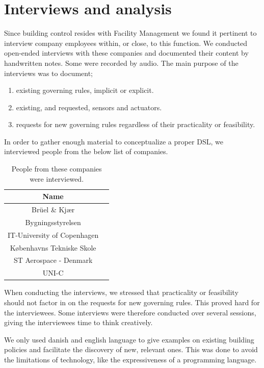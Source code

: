 \documentclass{llncs}
\begin{document}
\section{Interviews and analysis}\label{sec:interviews}
Since building control resides with Facility Management we found it pertinent to interview company employees within, or close, to this function. We conducted open-ended interviews with these companies and documented their content by handwritten notes. Some were recorded by audio. The main purpose of the interviews was to document;

\begin{enumerate}
	\item existing governing rules, implicit or explicit.
	\item existing, and requested, sensors and actuators.
	\item requests for new governing rules regardless of their practicality or feasibility.
\end{enumerate}

In order to gather enough material to conceptualize a proper DSL, we interviewed people from the below list of companies.\\ 

\begin{table}[htdp]
\begin{center}
\begin{tabular}{|c|c|}
	\textbf{Name}\\
	\hline 
	Br\"{u}el \& Kj\ae r\\
	Bygningsstyrelsen\\
	IT-University of Copenhagen\\
	K\o benhavns Tekniske Skole\\
	ST Aerospace - Denmark\\
	UNI-C\\
\end{tabular}
\end{center}
\label{tab:interviewees}
\caption{People from these companies were interviewed.}
\end{table}%

When conducting the interviews, we stressed that practicality or feasibility should not factor in on the requests for new governing rules. This proved hard for the interviewees. Some interviews were therefore conducted over several sessions, giving the interviewees time to think creatively. 

We only used danish and english language to give examples on existing building policies and facilitate the discovery of new, relevant ones. This was done to avoid the limitations of technology, like the expressiveness of a programming language.
\end{document}
